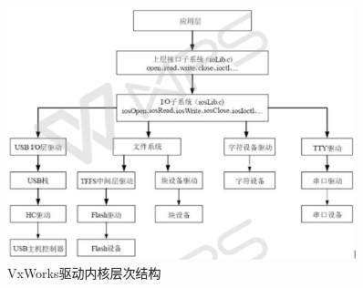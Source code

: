 \begin{figure}[!h]
\centering
\includegraphics[width=0.9\textwidth]{./graphics/vxworks-kernel-diagram.pdf}
\caption{VxWorks驱动内核层次结构}\label{fig:VxWorks内核驱动层次结构}
\end{figure}	
			
